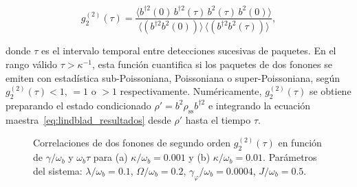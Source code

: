 \begin{equation}
	g_2^{(2)}(\tau) = \frac{\langle b^{\dagger 2}(0)\,b^{\dagger 2}(\tau)\,
		b^2(\tau)\,b^2(0)\rangle}
	{\langle (b^{\dagger 2}b^2 (0))\rangle\,\langle (b^{\dagger 2}b^2(\tau))\rangle},
	\label{eq:g2_bundle_texto}
\end{equation}

donde $\tau$ es el intervalo temporal entre detecciones sucesivas de paquetes. En el rango válido $\tau > \kappa^{-1}$, esta función cuantifica si los paquetes de dos fonones se emiten con estadística sub-Poissoniana, Poissoniana o super-Poissoniana, según $g_2^{(2)}(\tau) < 1$, $= 1$ o $> 1$ respectivamente. Numéricamente, $g_2^{(2)}(\tau)$ se obtiene preparando el estado condicionado $\rho' = b^2\rho_\mathrm{ss} b^{\dagger 2}$ e integrando la ecuación maestra~\eqref{eq:lindblad_resultados} desde $\rho'$ hasta el tiempo $\tau$.

\vspace{-0.58cm}
\begin{figure}[H]
	\centering
	
	\caption{Correlaciones de dos fonones de segundo orden $g_2^{(2)}(\tau)$ en función de $\gamma/\omega_b$ y $\omega_b\tau$ para (a) $\kappa/\omega_b = 0.001$ y (b) $\kappa/\omega_b = 0.01$. Parámetros del sistema: $\lambda/\omega_b = 0.1$, $\Omega/\omega_b = 0.2$, $\gamma_\varphi/\omega_b = 0.0004$, $J/\omega_b = 0.5$.}
	\label{fig:g2_decay}
\end{figure}

